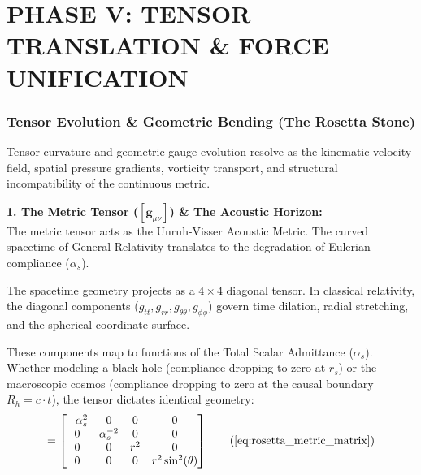 \newpage

\part*{PHASE V: TENSOR TRANSLATION \& FORCE UNIFICATION}






\section{Tensor Evolution \& Geometric Bending (The Rosetta Stone)}
\label{sec:deriv_rosetta_stone}

Tensor curvature and geometric gauge evolution resolve as the kinematic velocity field, spatial pressure gradients, vorticity transport, and structural incompatibility of the continuous metric.

\textbf{1. The Metric Tensor ($[\boldsymbol{g}_{\mu\nu}]$) \& The Acoustic Horizon:} \\
The metric tensor acts as the Unruh-Visser Acoustic Metric. The curved spacetime of General Relativity translates to the degradation of Eulerian compliance ($\alpha_s$). 

The spacetime geometry projects as a $4 \times 4$ diagonal tensor. In classical relativity, the diagonal components ($g_{tt}, g_{rr}, g_{\theta\theta}, g_{\phi\phi}$) govern time dilation, radial stretching, and the spherical coordinate surface. 

These components map to functions of the Total Scalar Admittance ($\alpha_s$). Whether modeling a black hole (compliance dropping to zero at $r_s$) or the macroscopic cosmos (compliance dropping to zero at the causal boundary $R_h = c \cdot t$), the tensor dictates identical geometry:
\begin{equation}
    [\boldsymbol{g}_{\mu\nu}] = \begin{bmatrix}
    -\alpha_s^2 & 0 & 0 & 0 \\
    0 & \alpha_s^{-2} & 0 & 0 \\
    0 & 0 & r^2 & 0 \\
    0 & 0 & 0 & r^2 \sin^2(\theta)
    \end{bmatrix} \tag{\ref{eq:rosetta_metric_matrix}}
\end{equation}

